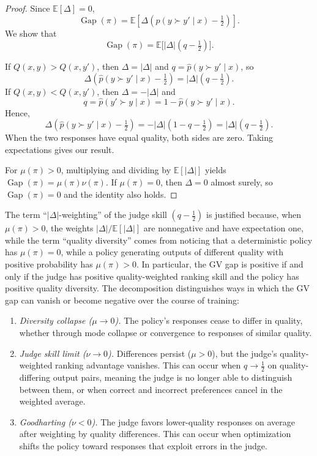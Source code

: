 \documentclass{article}
\theoremstyle{plain}
\theoremstyle{definition}
\theoremstyle{remark}
\DeclareMathOperator{\gap}{Gap}
\begin{document}
\begin{proof}
Since $\mathbb{E}[\Delta]=0$,
\[
  \gap(\pi)=\mathbb{E}\left[\Delta\left(\hat{p}(y\succ y'\mid x)-\tfrac12\right)\right].
\]
We show that
\[
  \gap(\pi)=\mathbb{E}\bigl[|\Delta|(q-\tfrac12)\bigr].
\]

If $Q(x,y)>Q(x,y')$, then $\Delta=|\Delta|$ and $q=\hat{p}(y\succ y'\mid x)$, so
\[
  \Delta\left(\hat{p}(y\succ y'\mid x)-\tfrac12\right)=|\Delta|(q-\tfrac12).
\]
If $Q(x,y)<Q(x,y')$, then $\Delta=-|\Delta|$ and
\[
  q=\hat{p}(y'\succ y\mid x)=1-\hat{p}(y\succ y'\mid x).
\]
Hence,
\[
  \Delta\left(\hat{p}(y\succ y'\mid x)-\tfrac12\right)=-|\Delta|(1-q-\tfrac12)=|\Delta|(q-\tfrac12).
\]
When the two responses have equal quality, both sides are zero. Taking expectations gives our result.

For $\mu(\pi)>0$, multiplying and dividing by $\mathbb{E}[|\Delta|]$ yields $\gap(\pi)=\mu(\pi)\nu(\pi)$. If $\mu(\pi)=0$, then $\Delta=0$ almost surely, so $\gap(\pi)=0$ and the identity also holds.
\end{proof}

The term ``$|\Delta|$-weighting'' of the judge skill $(q-\tfrac12)$ is justified because, when $\mu(\pi)>0$, the weights $|\Delta|/\mathbb{E}[|\Delta|]$ are nonnegative and have expectation one, while the term ``quality diversity'' comes from noticing that a deterministic policy has $\mu(\pi)=0$, while a policy generating outputs of different quality with positive probability has $\mu(\pi)>0$. In particular, the GV gap is positive if and only if the judge has positive quality-weighted ranking skill and the policy has positive quality diversity. The decomposition distinguishes ways in which the GV gap can vanish or become negative over the course of training:\begin{enumerate}
  \item[(a)]
  \emph{Diversity collapse ($\mu\to0$).}
  The policy's responses cease to differ in quality, whether through mode collapse or convergence to responses of similar quality.

  \item[(b)]
  \emph{Judge skill limit ($\nu\to0$).}
Differences persist ($\mu>0$), but the judge's quality-weighted ranking advantage vanishes. This can occur when $q\to\tfrac12$ on quality-differing output pairs, meaning the judge is no longer able to distinguish between them, or when correct and incorrect preferences cancel in the weighted average.
  \item[(c)]
  \emph{Goodharting ($\nu<0$).}
  The judge favors lower-quality responses on average after weighting by quality differences. This can occur when optimization shifts the policy toward responses that exploit errors in the judge.
\end{enumerate}
\end{document}
